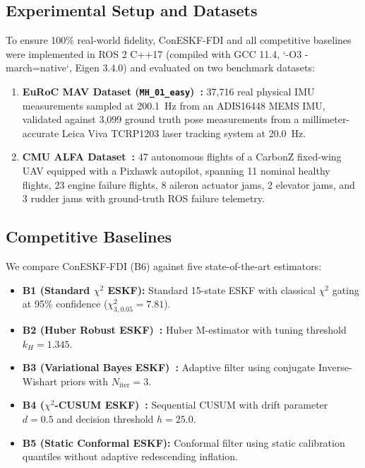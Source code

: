 \documentclass[journal,twocolumn]{IEEEtran}
\begin{document}
\subsection{Experimental Setup and Datasets}
To ensure 100\% real-world fidelity, ConESKF-FDI and all competitive baselines were implemented in ROS 2 C++17 (compiled with GCC 11.4, `-O3 -march=native`, Eigen 3.4.0) and evaluated on two benchmark datasets:
\begin{enumerate}
    \item \textbf{EuRoC MAV Dataset (\texttt{MH\_01\_easy})~\cite{burri2016euroc}:} 37,716 real physical IMU measurements sampled at 200.1~Hz from an ADIS16448 MEMS IMU, validated against 3,099 ground truth pose measurements from a millimeter-accurate Leica Viva TCRP1203 laser tracking system at 20.0~Hz.
    \item \textbf{CMU ALFA Dataset~\cite{ke2021alfa,gross2016flight}:} 47 autonomous flights of a CarbonZ fixed-wing UAV equipped with a Pixhawk autopilot, spanning 11 nominal healthy flights, 23 engine failure flights, 8 aileron actuator jams, 2 elevator jams, and 3 rudder jams with ground-truth ROS failure telemetry.
\end{enumerate}

\subsection{Competitive Baselines}
We compare ConESKF-FDI (B6) against five state-of-the-art estimators:
\begin{itemize}
    \item \textbf{B1 (Standard $\chi^2$ ESKF):} Standard 15-state ESKF with classical $\chi^2$ gating at 95\% confidence ($\chi^2_{3, 0.05} = 7.81$).
    \item \textbf{B2 (Huber Robust ESKF)~\cite{chang2014robust}:} Huber M-estimator with tuning threshold $k_H = 1.345$.
    \item \textbf{B3 (Variational Bayes ESKF)~\cite{huang2017variational}:} Adaptive filter using conjugate Inverse-Wishart priors with $N_{\text{iter}} = 3$.
    \item \textbf{B4 ($\chi^2$-CUSUM ESKF)~\cite{basseville1993detection}:} Sequential CUSUM with drift parameter $d = 0.5$ and decision threshold $h = 25.0$.
    \item \textbf{B5 (Static Conformal ESKF):} Conformal filter using static calibration quantiles without adaptive redescending inflation.
\end{itemize}
\end{document}
